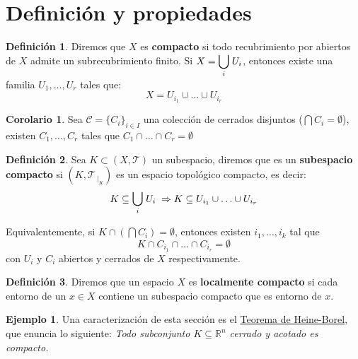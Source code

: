 \documentclass[12pt,twoside]{report}
\newcommand\mc[1]{\mathcal{#1}}
\theoremstyle{azul}
\theoremstyle{azul2}
\theoremstyle{plain}
\theoremstyle{definition}
\newtheorem*{eje}{Ejemplo}
\newtheorem*{defi}{Definición}
\newtheorem*{cor}{Corolario}
\theoremstyle{remark}
\begin{document}
\section{Definición y propiedades}
\begin{defi}
Diremos que $X$ es \textbf{compacto} si todo recubrimiento por abiertos de $X$ admite un subrecubrimiento finito. Si $X=\mathlarger{\bigcup}_{i} \; U_i $, entonces existe una familia $U_1, \ldots, U_r$ tales que:
$$X=U_{i_1} \cup \ldots \cup U_{i_r}$$
\end{defi}
\begin{cor}
Sea $\mc{C}=\{C_i\}_{i \in I}$ una colección de cerrados disjuntos ($\bigcap C_i = \emptyset$), existen $C_1, \ldots, C_r$ tales que $C_{1} \cap \ldots \cap C_{r} = \emptyset$
\end{cor}
\begin{defi}
Sea $K \subset (X, \mc{T})$ un subespacio, diremos que es un \textbf{subespacio compacto} si $(K, \mc{T}_{\:|_K})$ es un espacio topológico compacto, es decir:
$$K \subseteq \underset{i}{\mathlarger{\bigcup}} \; U_i \; \Rightarrow K \subseteq U_{i_1} \cup \ldots \cup U_{i_r}$$

Equivalentemente, si $K \cap (\bigcap C_i)=\emptyset$, entonces existen $i_1, \ldots, i_k$ tal que $$K \cap C_{i_1} \cap \ldots \cap C_{i_r} = \emptyset $$
con $U_i$ y $C_i$ abiertos y cerrados de $X$ respectivamente.
\end{defi}
\begin{defi}
Diremos que un espacio $X$ es \textbf{localmente compacto} si cada entorno de un $x \in X$ contiene un subespacio compacto que es entorno de $x$.
\end{defi}
\begin{eje}
Una caracterización de esta sección es el \underline{Teorema de Heine-Borel}, que enuncia lo siguiente: \textit{Todo subconjunto $K \subseteq \mathbb{R}^n$ cerrado y acotado es compacto.}
\end{eje}
\end{document}
